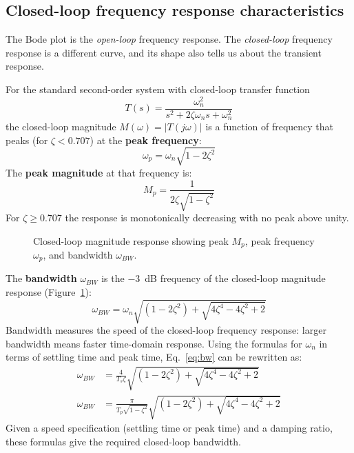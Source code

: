 \documentclass[../../book.tex]{subfiles}
\begin{document}
\subsection{Closed-loop frequency response characteristics}
\label{sec:cl_freq}

The Bode plot is the \emph{open-loop} frequency response.  The \emph{closed-loop}
frequency response is a different curve, and its shape also tells us about the
transient response.

For the standard second-order system with closed-loop transfer function
\begin{equation}
  T(s) = \frac{\omega_n^2}{s^2 + 2\zeta\omega_n s + \omega_n^2}
  \label{eq:cl_tf}
\end{equation}
the closed-loop magnitude $M(\omega) = |T(j\omega)|$ is a function of frequency
that peaks (for $\zeta < 0.707$) at the \textbf{peak frequency}:
\begin{equation}
  \omega_p = \omega_n\sqrt{1 - 2\zeta^2}
  \label{eq:peak_freq}
\end{equation}
The \textbf{peak magnitude} at that frequency is:
\begin{equation}
  M_p = \frac{1}{2\zeta\sqrt{1-\zeta^2}}
  \label{eq:mp}
\end{equation}
For $\zeta \geq 0.707$ the response is monotonically decreasing with no peak
above unity.

\begin{figure}[htbp]
  \caption{Closed-loop magnitude response showing peak $M_p$, peak frequency
    $\omega_p$, and bandwidth $\omega_{BW}$.}
  \label{fig:cl_mag}
\end{figure}

The \textbf{bandwidth} $\omega_{BW}$ is the $-3$~dB frequency of the
closed-loop magnitude response (Figure~\ref{fig:cl_mag}):
\begin{equation}
  \omega_{BW} = \omega_n\sqrt{(1-2\zeta^2)+\sqrt{4\zeta^4-4\zeta^2+2}}
  \label{eq:bw}
\end{equation}
Bandwidth measures the speed of the closed-loop frequency response: larger
bandwidth means faster time-domain response.  Using the formulas for $\omega_n$
in terms of settling time and peak time, Eq.~\eqref{eq:bw} can be rewritten as:
\begin{align}
  \omega_{BW} &= \frac{4}{T_s\zeta}
    \sqrt{(1-2\zeta^2)+\sqrt{4\zeta^4-4\zeta^2+2}}
  \label{eq:bw_ts} \\[4pt]
  \omega_{BW} &= \frac{\pi}{T_p\sqrt{1-\zeta^2}}
    \sqrt{(1-2\zeta^2)+\sqrt{4\zeta^4-4\zeta^2+2}}
  \label{eq:bw_tp}
\end{align}
Given a speed specification (settling time or peak time) and a damping ratio,
these formulas give the required closed-loop bandwidth.
\end{document}
